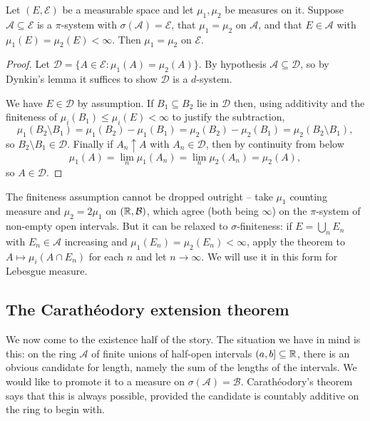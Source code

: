 \documentclass[a4paper]{scrartcl}
\newcommand{\cA}{\mathcal{A}}
\newcommand{\cB}{\mathcal{B}}
\newcommand{\cD}{\mathcal{D}}
\newcommand{\cE}{\mathcal{E}}
\begin{document}
\begin{theorem}\label{pm-thm:uniqueness}
	Let $(E, \cE)$ be a measurable space and let $\mu_1, \mu_2$ be measures on it. Suppose $\cA \subseteq \cE$ is a $\pi$-system with $\sigma(\cA) = \cE$, that $\mu_1 = \mu_2$ on $\cA$, and that $E \in \cA$ with $\mu_1(E) = \mu_2(E) < \infty$. Then $\mu_1 = \mu_2$ on $\cE$.
\end{theorem}
\begin{proof}
	Let $\cD = \{ A \in \cE : \mu_1(A) = \mu_2(A)\}$. By hypothesis $\cA \subseteq \cD$, so by Dynkin's lemma it suffices to show $\cD$ is a $d$-system.

	We have $E \in \cD$ by assumption. If $B_1 \subseteq B_2$ lie in $\cD$ then, using additivity and the finiteness of $\mu_i(B_1) \leq \mu_i(E) < \infty$ to justify the subtraction,
	$$
	\mu_1(B_2 \setminus B_1) = \mu_1(B_2) - \mu_1(B_1) = \mu_2(B_2) - \mu_2(B_1) = \mu_2(B_2 \setminus B_1),
	$$
	so $B_2 \setminus B_1 \in \cD$. Finally if $A_n \uparrow A$ with $A_n \in \cD$, then by continuity from below
	$$
	\mu_1(A) = \lim_n \mu_1(A_n) = \lim_n \mu_2(A_n) = \mu_2(A),
	$$
	so $A \in \cD$.
\end{proof}

\begin{remark}
	The finiteness assumption cannot be dropped outright -- take $\mu_1$ counting measure and $\mu_2 = 2\mu_1$ on $(\R, \cB)$, which agree (both being $\infty$) on the $\pi$-system of non-empty open intervals. But it can be relaxed to $\sigma$-finiteness: if $E = \bigcup_n E_n$ with $E_n \in \cA$ increasing and $\mu_1(E_n) = \mu_2(E_n) < \infty$, apply the theorem to $A \mapsto \mu_i(A \cap E_n)$ for each $n$ and let $n \to \infty$. We will use it in this form for Lebesgue measure.
\end{remark}

\subsection{The Carath\'eodory extension theorem}

We now come to the existence half of the story. The situation we have in mind is this: on the ring $\cA$ of finite unions of half-open intervals $(a,b] \subseteq \mathbb{R}$, there is an obvious candidate for length, namely the sum of the lengths of the intervals. We would like to promote it to a measure on $\sigma(\cA) = \cB$. Carath\'eodory's theorem says that this is always possible, provided the candidate is countably additive on the ring to begin with.
\end{document}
